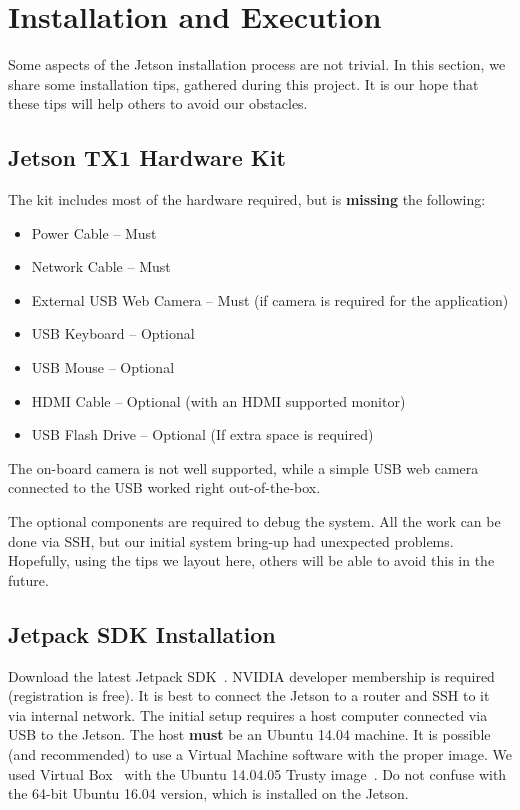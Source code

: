 \section{Installation and Execution}
\label{sec:installation}
Some aspects of the Jetson installation process are not trivial. In this section, we share some installation tips, gathered during this project. It is our hope that these tips will help others to avoid our obstacles.

\subsection{Jetson TX1 Hardware Kit}
The kit includes most of the hardware required, but is \textbf{missing} the following:
\begin{itemize}
\setlength\itemsep{0.1em}
\item Power Cable -- Must
\item Network Cable -- Must
\item External USB Web Camera -- Must (if camera is required for the application)
\item USB Keyboard -- Optional
\item USB Mouse -- Optional
\item HDMI Cable -- Optional (with an HDMI supported monitor)
\item USB Flash Drive -- Optional (If extra space is required)
\end{itemize}

The on-board camera is not well supported, while a simple USB web camera connected to the USB worked right out-of-the-box.

The optional components are required to debug the system. All the work can be done via SSH, but our initial system bring-up had unexpected problems. Hopefully, using the tips we layout here, others will be able to avoid this in the future.

\subsection{Jetpack SDK Installation}
Download the latest Jetpack SDK~\cite{jetpackinstall}. NVIDIA developer membership is required (registration is free).
It is best to connect the Jetson to a router and SSH to it via internal network. The initial setup requires a host computer connected via USB to the Jetson. The host \textbf{must} be an Ubuntu 14.04 machine. It is possible (and recommended) to use a Virtual Machine software with the proper image. We used Virtual Box~\cite{virtualboxinstall} with the Ubuntu 14.04.05 Trusty image~\cite{virtualboxubuntuimage}. Do not confuse with the 64-bit Ubuntu 16.04 version, which is installed on the Jetson.

